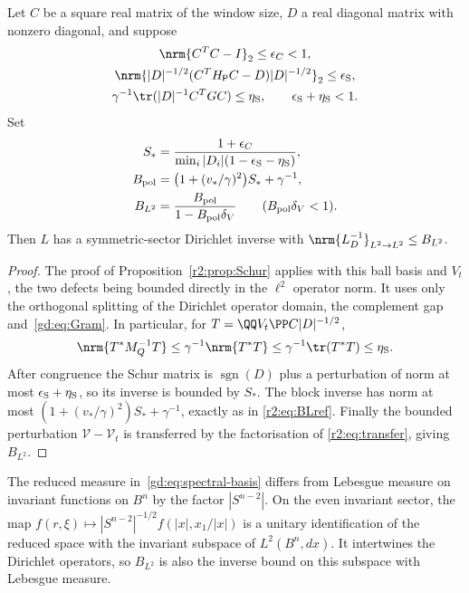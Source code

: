 \begin{proposition}\label{gd:prop:Schur}
Let $C$ be a square real matrix of the window size, $D$ a real
diagonal matrix with nonzero diagonal, and suppose
\begin{equation}\label{gd:eq:Schur-gates}
 \begin{gathered}
 \nrm{C^TC-I}_2\le\epsilon_C<1,\\
 \nrm{|D|^{-1/2}(C^TH_{\mathsf P}C-D)|D|^{-1/2}}_2\le\epsilon_{\rm S},\\
 \gamma^{-1}\tr(|D|^{-1}C^TGC)\le\eta_{\rm S},\qquad\epsilon_{\rm S}+\eta_{\rm S}<1.
 \end{gathered}
\end{equation}
Set
\begin{equation}\label{gd:eq:L2}
 \begin{split}
 S_*&=\frac{1+\epsilon_C}{\min_i|D_i|(1-\epsilon_{\rm S}-\eta_{\rm S})},\\
 B_{\rm pol}&=\bigl(1+(v_*/\gamma)^2\bigr)S_*+\gamma^{-1},\\
 B_{L^2}&=\frac{B_{\rm pol}}{1-B_{\rm pol}\delta_V}\qquad(B_{\rm pol}\delta_V<1).
 \end{split}
\end{equation}
Then $L$ has a symmetric-sector Dirichlet inverse with
$\nrm{L_D^{-1}}_{L^2\to L^2}\le B_{L^2}$.
\end{proposition}
\begin{proof}
The proof of Proposition~\ref{r2:prop:Schur} applies with this ball basis
and $V_t$, the two defects being bounded directly in the $\ell^2$
operator norm. It uses only the orthogonal splitting of the Dirichlet
operator domain, the complement gap and~\eqref{gd:eq:Gram}.
In particular, for $T=\QQ V_t\PP C|D|^{-1/2}$,
\[
 \nrm{T^*M_Q^{-1}T}\le\gamma^{-1}\nrm{T^*T}
 \le\gamma^{-1}\tr(T^*T)\le\eta_{\rm S}.
\]
After congruence the Schur matrix is $\operatorname{sgn}(D)$ plus a
perturbation of norm at most $\epsilon_{\rm S}+\eta_{\rm S}$, so its inverse is bounded
by $S_*$. The block inverse has norm at most
$(1+(v_*/\gamma)^2)S_*+\gamma^{-1}$, exactly as in
\eqref{r2:eq:BLref}. Finally the bounded perturbation
$\mathcal V-\mathcal V_t$ is transferred by the factorisation of
\eqref{r2:eq:transfer}, giving $B_{L^2}$.
\end{proof}

The reduced measure in~\eqref{gd:eq:spectral-basis} differs from
Lebesgue measure on invariant functions on $B^n$ by the factor
$|S^{n-2}|$. On the even invariant sector, the map
$f(r,\xi)\mapsto |S^{n-2}|^{-1/2}f(|x|,x_1/|x|)$ is a unitary
identification of the reduced space with the invariant subspace of
$L^2(B^n,dx)$. It intertwines the Dirichlet operators, so $B_{L^2}$
is also the inverse bound on this subspace with Lebesgue measure.

